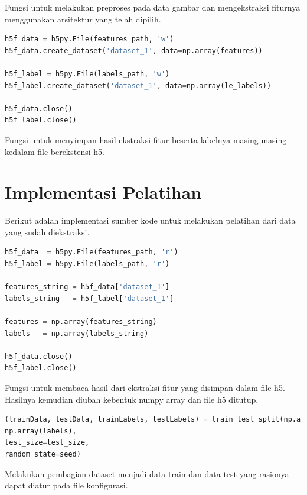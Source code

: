 \par Fungsi untuk melakukan preproses pada data gambar dan mengekstraksi fiturnya menggunakan arsitektur yang telah dipilih.

\begin{lstlisting}[language=python, caption=Menyimpan hasil ekstraksi fitur, label=code:save_h5, firstnumber=149]
h5f_data = h5py.File(features_path, 'w')
h5f_data.create_dataset('dataset_1', data=np.array(features))

h5f_label = h5py.File(labels_path, 'w')
h5f_label.create_dataset('dataset_1', data=np.array(le_labels))

h5f_data.close()
h5f_label.close() 
\end{lstlisting}

\par Fungsi untuk menyimpan hasil ekstraksi fitur beserta labelnya masing-masing kedalam file berekstensi h5.

\section{Implementasi Pelatihan}
\par Berikut adalah implementasi sumber kode untuk melakukan pelatihan dari data yang sudah diekstraksi. 

\begin{lstlisting}[language=python, caption=Membaca file hasil ekstraksi fitur, label=code:read_h5, firstnumber=34]
h5f_data  = h5py.File(features_path, 'r')
h5f_label = h5py.File(labels_path, 'r')

features_string = h5f_data['dataset_1']
labels_string   = h5f_label['dataset_1']

features = np.array(features_string)
labels   = np.array(labels_string)

h5f_data.close()
h5f_label.close()
\end{lstlisting}

Fungsi untuk membaca hasil dari ekstraksi fitur yang disimpan dalam file h5. Hasilnya kemudian diubah kebentuk numpy array dan file h5 ditutup.

\begin{lstlisting}[language=python, caption=Membagi data test dan data train, label=code:train_test_split, firstnumber=52]
(trainData, testData, trainLabels, testLabels) = train_test_split(np.array(features),
np.array(labels),
test_size=test_size,
random_state=seed)
\end{lstlisting}

\par Melakukan pembagian dataset menjadi data train dan data test yang rasionya dapat diatur pada file konfigurasi.

